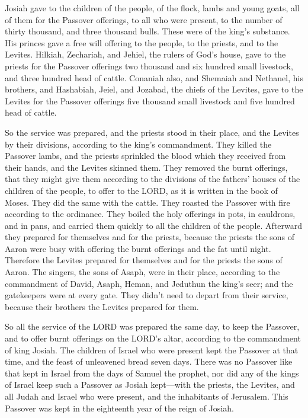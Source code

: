  Josiah gave to the children of the people, of the flock,
lambs and young goats, all of them for the Passover offerings, to all
who were present, to the number of thirty thousand, and three thousand
bulls. These were of the king's substance.  His princes
gave a free will offering to the people, to the priests, and to the
Levites. Hilkiah, Zechariah, and Jehiel, the rulers of God's house, gave
to the priests for the Passover offerings two thousand and six hundred
small livestock, and three hundred head of cattle. 
Conaniah also, and Shemaiah and Nethanel, his brothers, and Hashabiah,
Jeiel, and Jozabad, the chiefs of the Levites, gave to the Levites for
the Passover offerings five thousand small livestock and five hundred
head of cattle.

 So the service was prepared, and the priests stood in
their place, and the Levites by their divisions, according to the king's
commandment.  They killed the Passover lambs, and the
priests sprinkled the blood which they received from their hands, and
the Levites skinned them.  They removed the burnt
offerings, that they might give them according to the divisions of the
fathers' houses of the children of the people, to offer to the LORD, as
it is written in the book of Moses. They did the same with the cattle.
 They roasted the Passover with fire according to the
ordinance. They boiled the holy offerings in pots, in cauldrons, and in
pans, and carried them quickly to all the children of the people.
 Afterward they prepared for themselves and for the
priests, because the priests the sons of Aaron were busy with offering
the burnt offerings and the fat until night. Therefore the Levites
prepared for themselves and for the priests the sons of Aaron.
 The singers, the sons of Asaph, were in their place,
according to the commandment of David, Asaph, Heman, and Jeduthun the
king's seer; and the gatekeepers were at every gate. They didn't need to
depart from their service, because their brothers the Levites prepared
for them.

 So all the service of the LORD was prepared the same
day, to keep the Passover, and to offer burnt offerings on the LORD's
altar, according to the commandment of king Josiah.  The
children of Israel who were present kept the Passover at that time, and
the feast of unleavened bread seven days.  There was no
Passover like that kept in Israel from the days of Samuel the prophet,
nor did any of the kings of Israel keep such a Passover as Josiah
kept---with the priests, the Levites, and all Judah and Israel who were
present, and the inhabitants of Jerusalem.  This Passover
was kept in the eighteenth year of the reign of Josiah.


